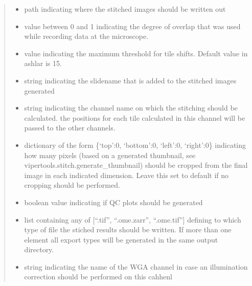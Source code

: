 \documentclass[a4paper,10pt,english,openany,oneside]{sphinxmanual}
\begin{document}
\begin{fulllineitems}
\begin{quote}
\begin{description}
\begin{itemize}
\item {} 
\sphinxAtStartPar
{} \textendash{} path indicating where the stitched images should be written out

\item {} 
\sphinxAtStartPar
{} \textendash{} value between 0 and 1 indicating the degree of overlap that was used while recording data at the microscope.

\item {} 
\sphinxAtStartPar
{} \textendash{} value indicating the maximum threshold for tile shifts. Default value in ashlar is 15.

\item {} 
\sphinxAtStartPar
{} \textendash{} string indicating the slidename that is added to the stitched images generated

\item {} 
\sphinxAtStartPar
{} \textendash{} string indicating the channel name on which the stitching should be calculated. the positions for each tile calculated in this channel will be
passed to the other channels.

\item {} 
\sphinxAtStartPar
{} \textendash{} dictionary of the form \{‘top’:0, ‘bottom’:0, ‘left’:0, ‘right’:0\} indicating how many pixels (based on a generated thumbnail,
see vipertools.stitch.generate\_thumbnail) should be cropped from the final image in each indicated dimension. Leave this set to default
if no cropping should be performed.

\item {} 
\sphinxAtStartPar
{} \textendash{} boolean value indicating if QC plots should be generated

\item {} 
\sphinxAtStartPar
{} \textendash{} list containing any of {[}“.tif”, “.ome.zarr”, “.ome.tif”{]} defining to which type of file the stiched results should be written. If more than one
element all export types will be generated in the same output directory.

\item {} 
\sphinxAtStartPar
{} \textendash{} string indicating the name of the WGA channel in case an illumination correction should be performed on this cahhenl


\end{itemize}
\end{description}
\end{quote}
\end{fulllineitems}
\end{document}
